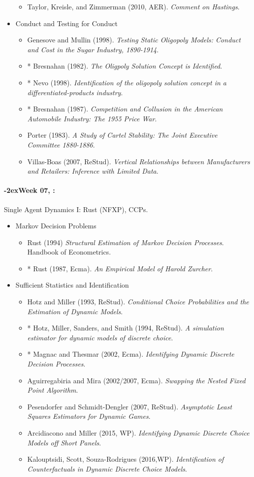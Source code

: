 \documentclass[11pt]{article}
\newcommand{\week}[1]{%
  \paragraph*{\kern-2ex\quad #1, \syldate{\today}:}%
  \ifdim\wd1=\wd\THURSDAY
    \AdvanceDate[7]
  \else
    \AdvanceDate[7]
  \fi%
}
\begin{document}
\begin{itemize}
\begin{itemize}
\item Taylor, Kreisle, and Zimmerman (2010, AER). \textit{Comment on Hastings}.
\end{itemize}
\item Conduct and Testing for Conduct
\begin{itemize}
\item Genesove and Mullin (1998). \textit{Testing Static Oligopoly Models: Conduct and Cost in the Sugar Industry, 1890-1914}.
\item * Bresnahan (1982). \textit{The Oligpoly Solution Concept is Identified}.
\item * Nevo (1998). \textit{Identification of the oligopoly solution concept in a differentiated-products industry}.
\item * Bresnahan (1987). \textit{Competition and Collusion in the American Automobile Industry: The 1955 Price War}.
\item Porter (1983). \textit{A Study of Cartel Stability: The Joint Executive Committee 1880-1886}.
\item Villas-Boas (2007, ReStud). \textit{Vertical Relationships between Manufacturers and Retailers: Inference with Limited Data}.
\end{itemize}
\end{itemize}


\week{Week 07} Single Agent Dynamics I: Rust (NFXP), CCPs.
\begin{itemize}
\item Markov Decision Problems
\begin{itemize}
\item Rust (1994) \textit{Structural Estimation of Markov Decision Processes}. Handbook of Econometrics.
\item * Rust (1987, Ecma). \textit{An Empirical Model of Harold Zurcher}.
\end{itemize}
\item Sufficient Statistics and Identification
\begin{itemize}
\item Hotz and Miller (1993, ReStud). \textit{Conditional Choice Probabilities and the Estimation of Dynamic Models}.
\item * Hotz, Miller, Sanders, and Smith (1994, ReStud). \textit{A simulation estimator for dynamic models of discrete choice}.
\item * Magnac and Thesmar (2002, Ecma). \textit{Identifying Dynamic Discrete Decision Processes}.
\item Aguirregabiria and Mira (2002/2007, Ecma). \textit{Swapping the Nested Fixed Point Algorithm}.
\item Pesendorfer and Schmidt-Dengler (2007, ReStud). \textit{Asymptotic Least Squares Estimators for Dynamic Games}.
\item Arcidiacono and Miller (2015, WP). \textit{Identifying Dynamic Discrete Choice Models
off Short Panels}.
\item Kalouptsidi, Scott, Souza-Rodrigues (2016,WP). \textit{Identification of Counterfactuals
in Dynamic Discrete Choice Models}.
\end{itemize}
\end{itemize}
\end{document}
